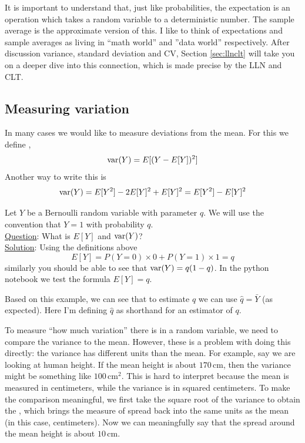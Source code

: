  It is important to understand that, just like probabilities, the expectation is an operation which takes a random variable to a deterministic number. The sample average is the approximate version of this. I like to think of expectations and sample averages as living in ``math world'' and ''data world'' respectively. After discussion variance, standard deviation and CV, Section \ref{sec:llnclt} will take you on a deeper dive into this connection, which is made precise by the LLN and CLT. 





\subsection{Measuring variation}
 In many cases we would like to measure deviations from the mean. For this we define ,
\begin{equation*}
{\rm var}(Y) = E[(Y-E[Y])^2]
\end{equation*}
Another way to write this is 
\begin{equation*}
 {\rm var}(Y) = E[Y^2] - 2E[Y]^2 + E[Y]^2 = E[Y^2]-E[Y]^2
\end{equation*}

\begin{example}
Let $Y$ be a Bernoulli random variable with parameter $q$. We will use the convention that $Y=1$ with probability $q$.\\


\noindent
\underline{Question}: What is $E[Y]$ and ${\rm var}(Y)$?\\

\noindent
\underline{Solution}: Using the definitions above
\begin{equation*}
E[Y] = P(Y=0)\times 0 + P(Y=1)\times 1 = q
\end{equation*}
similarly you should be able to see that ${\rm var}(Y) = q(1-q)$. 
In the python notebook we test the formula $E[Y]=q$. 
\end{example}

Based on this example, we can see that to estimate $q$ we can use $\hat{q} = \bar{Y}$ (as expected). Here I'm defining $\hat{q}$ as shorthand for an estimator of $q$. 


To measure ``how much variation'' there is in a random variable, we need to compare the variance to the mean. However, these is a problem with doing this directly: the variance has different units than the mean. For example, say we are looking at human height. If the mean height is about $170 \,\text{cm}$, then the variance might be something like $100 \,\text{cm}^2$. This is hard to interpret because the mean is measured in centimeters, while the variance is in squared centimeters. To make the comparison meaningful, we first take the square root of the variance to obtain the , which brings the measure of spread back into the same units as the mean (in this case, centimeters). Now we can meaningfully say that the spread around the mean height is about $10 \,\text{cm}$.  

